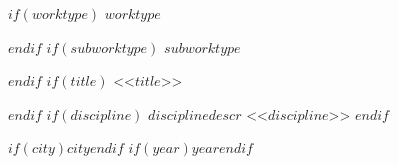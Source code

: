 \begin{titlepage}
  \bigskip
  \bigskip

  \approvedStamp

  \bigskip
  \bigskip

  \begin{center}
  
    $if(worktype)$
    \MakeUppercase{$worktype$} \par
    \smallskip
    $endif$
    $if(subworktype)$
    $subworktype$ \par
    \smallskip
    $endif$
    $if(title)$
    <<$title$>>\par
    \smallskip
    $endif$
    $if(discipline)$
    \medskip%
    $disciplinedescr$
    <<$discipline$>>
    \bigskip
    $endif$
  \end{center}

  \vspace{\fill}
  
  \bigskip%
  \authorTable


  \begin{center}
    \vspace*{\fill}
    $if(city)${$city$}$endif$
    $if(year)${$year$}$endif$
  \end{center}
  
\end{titlepage}
\restoregeometry
